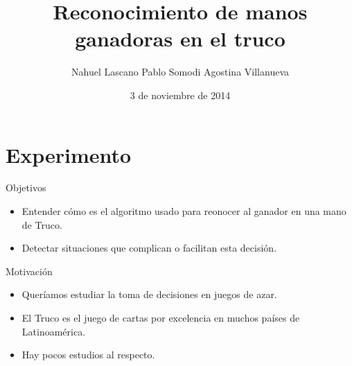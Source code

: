 \documentclass{beamer}
\title[Toma de decisión en juegos de azar]{Reconocimiento de manos ganadoras en el truco}
\author{Nahuel Lascano \newline Pablo Somodi \newline Agostina Villanueva}
\institute{Departamento de Computación - FCEyN - UBA}
\date{3 de noviembre de 2014}
\begin{document}
\begin{frame}
  \titlepage
\end{frame}


\section{Experimento}

\begin{frame}{Objetivos}

\begin{itemize}
  \item Entender cómo es el algoritmo usado para reonocer al ganador en una mano de Truco.
  \item Detectar situaciones que complican o facilitan esta decisión.
\end{itemize}

\end{frame}


\begin{frame}{Motivación}

\begin{itemize}
\item Queríamos estudiar la toma de decisiones en juegos de azar.
\item El Truco es el juego de cartas por excelencia en muchos países de Latinoamérica.
\item Hay pocos estudios al respecto.
\end{itemize}

\end{frame}
\end{document}
